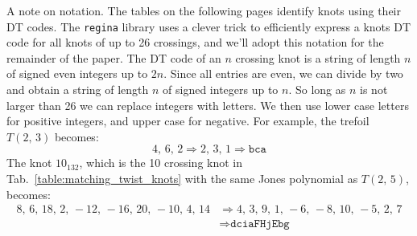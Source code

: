 \documentclass{article}
\theoremstyle{plain}
\begin{document}
        A note on notation. The tables on the following pages identify knots using their DT
        codes. The \texttt{regina} library \cite{regina} uses a clever trick to efficiently
        express a knots DT code for all knots of up to 26 crossings, and we'll
        adopt this notation for the remainder of the paper. The DT code of an
        $n$ crossing knot is a string of length $n$ of signed even integers up
        to $2n$. Since all entries are even, we can divide by two and obtain
        a string of length $n$ of signed integers up to $n$. So long as $n$ is
        not larger than 26 we can replace integers with letters. We then use
        lower case letters for positive integers, and upper case for negative.
        For example, the trefoil $T(2,\,3)$ becomes:
        \begin{equation}
            4,\,6,\,2
            \Rightarrow
            2,\,3,\,1
            \Rightarrow
            \texttt{bca}
        \end{equation}
        The knot $10_{132}$, which is the 10 crossing knot in
        Tab.~\ref{table:matching_twist_knots} with the same Jones polynomial
        as $T(2,\,5)$, becomes:
        \begin{align}
            8,\,6,\,18,\,2,\,-12,\,-16,\,20,\,-10,\,4,\,14
            &\Rightarrow
            4,\,3,\,9,\,1,\,-6,\,-8,\,10,\,-5,\,2,\,7\\
            &\Rightarrow
            \texttt{dciaFHjEbg}
        \end{align}
\end{document}
